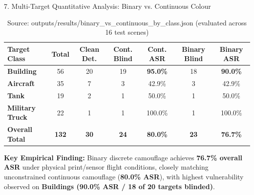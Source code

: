\documentclass[aspectratio=169, 10pt]{beamer}
\begin{document}
\begin{frame}{7. Multi-Target Quantitative Analysis: Binary vs. Continuous Colour}
\vspace{0.2em}

\begin{table}[h]
\centering
\small
\renewcommand{\arraystretch}{1.20}
\begin{tabular}{lcccccc}
\toprule
\textbf{Target Class} & \textbf{Total} & \textbf{Clean Det.} & \textbf{Cont. Blind} & \textbf{Cont. ASR} & \textbf{Binary Blind} & \textbf{Binary ASR} \\
\midrule
\textbf{Building}       & 56  & 20 & 19 & \textbf{95.0\%} & 18 & \textbf{90.0\%} \\
\textbf{Aircraft}       & 35  & 7  & 3  & 42.9\%          & 3  & 42.9\% \\
\textbf{Tank}           & 19  & 2  & 1  & 50.0\%          & 1  & 50.0\% \\
\textbf{Military Truck} & 22  & 1  & 1  & 100.0\%         & 1  & 100.0\% \\
\midrule
\rowcolor{NavyBlue!15}
\textbf{Overall Total}  & \textbf{132} & \textbf{30} & \textbf{24} & \textbf{80.0\%} & \textbf{23} & \textbf{76.7\%} \\
\bottomrule
\end{tabular}
\caption*{\scriptsize Source: outputs/results/binary\_vs\_continuous\_by\_class.json (evaluated across 16 test scenes)}
\end{table}

\vspace{0.5em}
\begin{center}
\footnotesize
\textbf{Key Empirical Finding:} Binary discrete camouflage achieves \textbf{76.7\% overall ASR} under physical print/sensor flight conditions, closely matching unconstrained continuous camouflage (\textbf{80.0\% ASR}), with highest vulnerability observed on \textbf{Buildings (90.0\% ASR / 18 of 20 targets blinded)}.
\end{center}
\end{frame}
\end{document}
